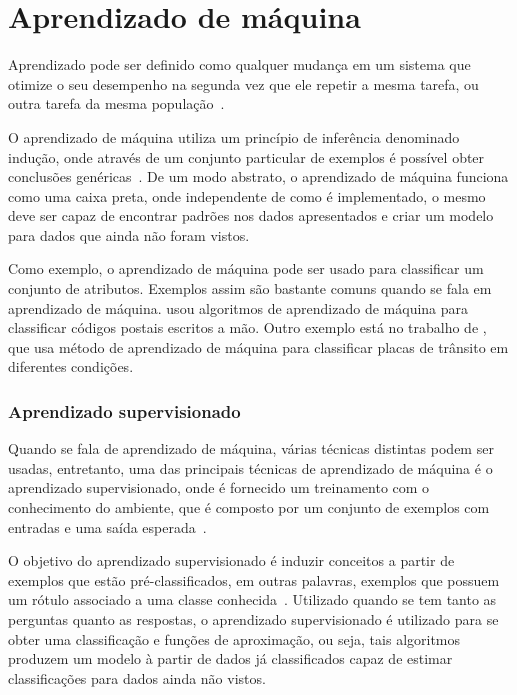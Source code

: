 \chapter{Aprendizado de máquina}

Aprendizado pode ser definido como qualquer mudança em um sistema que
otimize o seu desempenho na segunda vez que ele repetir a mesma tarefa,
ou outra tarefa da mesma população~\cite{custodio2010aprendizadomaquina}.

O aprendizado de máquina utiliza um princípio de inferência denominado
indução, onde através de um conjunto particular de exemplos é possível
obter conclusões genéricas~\cite{bruno2010aprendizadomaquina}. De um modo
abstrato, o aprendizado de máquina funciona como uma caixa preta, onde
independente de como é implementado, o mesmo deve ser capaz de encontrar padrões
nos dados apresentados e criar um modelo para dados que ainda não foram vistos.

Como exemplo, o aprendizado de máquina pode ser usado para classificar
um conjunto de atributos. Exemplos assim são bastante comuns quando se fala em
aprendizado de máquina.  usou algoritmos de
aprendizado de máquina para classificar códigos postais escritos a mão. Outro
exemplo está no trabalho de , que usa método de
aprendizado de máquina para classificar placas de trânsito em diferentes
condições.


\subsection{Aprendizado supervisionado}

Quando se fala de aprendizado de máquina, várias técnicas distintas podem ser
usadas, entretanto, uma das principais técnicas de aprendizado de máquina é o aprendizado
supervisionado, onde é fornecido um treinamento com o conhecimento do
ambiente, que é composto por um conjunto de exemplos com entradas
e uma saída esperada~\cite{bruno2010aprendizadomaquina}.

O objetivo do aprendizado supervisionado é induzir conceitos a partir de
exemplos que estão pré-classificados, em outras palavras, exemplos que
possuem um rótulo associado a uma classe conhecida~\cite{bruno2010aprendizadomaquina}.
Utilizado quando se tem tanto as perguntas quanto as respostas, o aprendizado
supervisionado é utilizado para se obter uma classificação e funções de aproximação, ou seja,
tais algoritmos produzem um modelo à partir de dados já classificados capaz de estimar classificações
para dados ainda não vistos.

